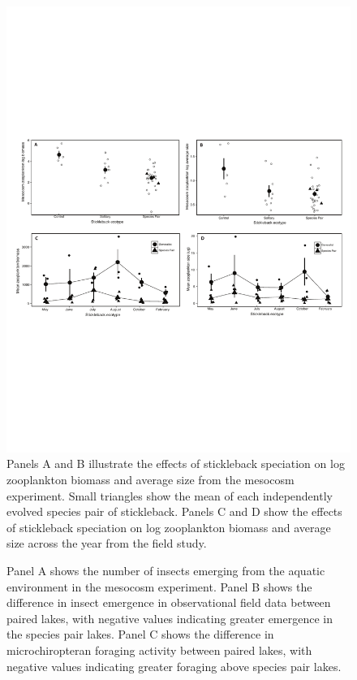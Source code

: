 \documentclass[11pt]{article}
\begin{document}
\begin{figure}[h!]
\includegraphics[trim=1cm 8cm 1cm 8cm, scale=0.8]{repeat_Fig1_161109.pdf}
\caption{Panels A and B illustrate the effects of stickleback speciation on log zooplankton biomass and average size from the mesocosm experiment.  Small triangles show the mean of each independently evolved species pair of stickleback.  Panels C and D show the effects of stickleback speciation on log zooplankton biomass and average size across the year from the field study.}
\label{Fig:Zoop}
\end{figure}

\newpage

\begin{figure}[h!]
\caption{Panel A shows the number of insects emerging from the aquatic environment in the mesocosm experiment.  Panel B shows the difference in insect emergence in observational field data between paired lakes, with negative values indicating greater emergence in the species pair lakes.  Panel C shows the difference in microchiropteran foraging activity between paired lakes, with negative values indicating greater foraging above species pair lakes.}
\label{Fig:AnotherFigure}
\end{figure}
\end{document}
